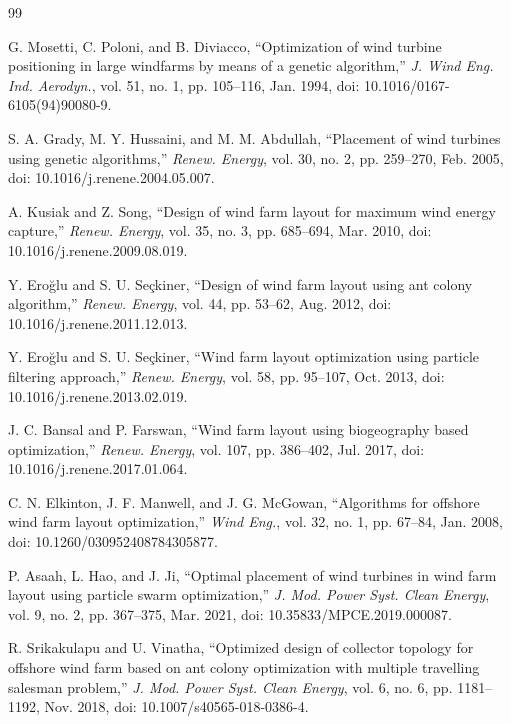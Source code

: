 \begin{thebibliography}{99}

G. Mosetti, C. Poloni, and B. Diviacco, ``Optimization of wind turbine positioning in large windfarms by means of a genetic algorithm,'' \textit{J. Wind Eng. Ind. Aerodyn.}, vol. 51, no. 1, pp. 105--116, Jan. 1994, doi: 10.1016/0167-6105(94)90080-9.

S. A. Grady, M. Y. Hussaini, and M. M. Abdullah, ``Placement of wind turbines using genetic algorithms,'' \textit{Renew. Energy}, vol. 30, no. 2, pp. 259--270, Feb. 2005, doi: 10.1016/j.renene.2004.05.007.

A. Kusiak and Z. Song, ``Design of wind farm layout for maximum wind energy capture,'' \textit{Renew. Energy}, vol. 35, no. 3, pp. 685--694, Mar. 2010, doi: 10.1016/j.renene.2009.08.019.

Y. Ero\u{g}lu and S. U. Se\c{c}kiner, ``Design of wind farm layout using ant colony algorithm,'' \textit{Renew. Energy}, vol. 44, pp. 53--62, Aug. 2012, doi: 10.1016/j.renene.2011.12.013.

Y. Ero\u{g}lu and S. U. Se\c{c}kiner, ``Wind farm layout optimization using particle filtering approach,'' \textit{Renew. Energy}, vol. 58, pp. 95--107, Oct. 2013, doi: 10.1016/j.renene.2013.02.019.

J. C. Bansal and P. Farswan, ``Wind farm layout using biogeography based optimization,'' \textit{Renew. Energy}, vol. 107, pp. 386--402, Jul. 2017, doi: 10.1016/j.renene.2017.01.064.

C. N. Elkinton, J. F. Manwell, and J. G. McGowan, ``Algorithms for offshore wind farm layout optimization,'' \textit{Wind Eng.}, vol. 32, no. 1, pp. 67--84, Jan. 2008, doi: 10.1260/030952408784305877.

P. Asaah, L. Hao, and J. Ji, ``Optimal placement of wind turbines in wind farm layout using particle swarm optimization,'' \textit{J. Mod. Power Syst. Clean Energy}, vol. 9, no. 2, pp. 367--375, Mar. 2021, doi: 10.35833/MPCE.2019.000087.

R. Srikakulapu and U. Vinatha, ``Optimized design of collector topology for offshore wind farm based on ant colony optimization with multiple travelling salesman problem,'' \textit{J. Mod. Power Syst. Clean Energy}, vol. 6, no. 6, pp. 1181--1192, Nov. 2018, doi: 10.1007/s40565-018-0386-4.


\end{thebibliography}
